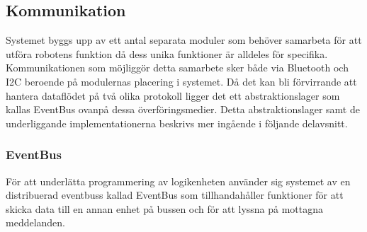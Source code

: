 \documentclass{article}
\begin{document}
\subsection{Kommunikation}
Systemet byggs upp av ett antal separata moduler som behöver samarbeta för att utföra robotens funktion då dess unika funktioner är alldeles för specifika. Kommunikationen som möjliggör detta samarbete sker både via Bluetooth och I2C beroende på modulernas placering i systemet. Då det kan bli förvirrande att hantera dataflödet på två olika protokoll ligger det ett abstraktionslager som kallas EventBus ovanpå dessa överföringsmedier. Detta abstraktionslager samt de underliggande implementationerna beskrivs mer ingående i följande delavsnitt. 

\subsubsection{EventBus}
\label{sec:eventbus}
För att underlätta programmering av logikenheten använder sig systemet av en distribuerad eventbuss kallad EventBus som tillhandahåller funktioner för att skicka data till en annan enhet på bussen och för att lyssna på mottagna meddelanden.
\end{document}
